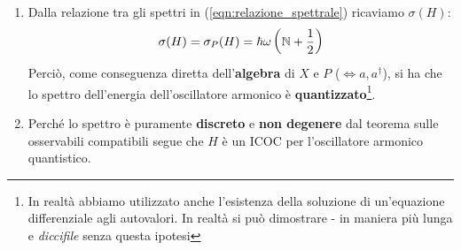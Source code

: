 \documentclass[../../FisicaTeorica.tex]{subfiles}
\begin{document}
\begin{enumerate}
\item Dalla relazione tra gli spettri in (\ref{eqn:relazione_spettrale}) ricaviamo $\sigma(H)$:
\begin{align*}
\sigma(H)=\sigma_P(H)=\hbar \omega\left(\mathbb{N}+\frac{1}{2}\right)
\end{align*}
Perciò, come conseguenza diretta dell'\textbf{algebra} di $X$ e $P$ ($\Leftrightarrow a, a^\dag$), si ha che lo spettro dell'energia dell'oscillatore armonico è \textbf{quantizzato}\footnote{In realtà abbiamo utilizzato anche l'esistenza della soluzione di un'equazione differenziale agli autovalori. In realtà si può dimostrare - in maniera più lunga e \textit{diccifile} senza questa ipotesi}.
\item Perché lo spettro è puramente \textbf{discreto} e \textbf{non degenere} dal teorema sulle osservabili compatibili segue che $H$ è un ICOC per l'oscillatore armonico quantistico.\\
\end{enumerate}
\end{document}
